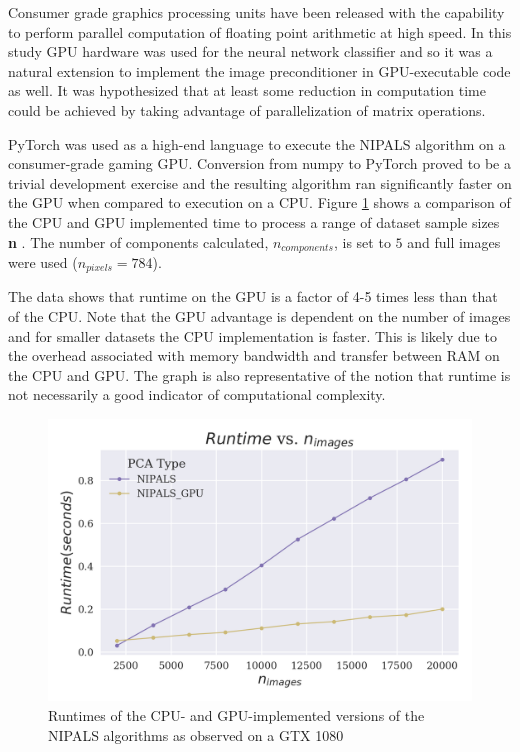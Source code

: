 \documentclass[12pt]{article}
\begin{document}
Consumer grade graphics processing units have been released with the capability to perform parallel computation of floating point arithmetic at high speed. In this study GPU hardware was used for the neural network classifier and so it was a natural extension to implement the image preconditioner in GPU-executable code as well. It was hypothesized that at least some reduction in computation time could be achieved by taking advantage of parallelization of matrix operations.

PyTorch was used as a high-end language to execute the NIPALS algorithm on a consumer-grade gaming GPU. Conversion from numpy to PyTorch proved to be a trivial development exercise and the resulting algorithm ran significantly faster on the GPU when compared to execution on a CPU. Figure \ref{parallelization} shows a comparison of the CPU and GPU implemented time to process a range of dataset sample sizes \textbf{n} . The number of components calculated, $n_{components}$, is set to $5$ and full images were used ($n_{pixels}=784$).

The data shows that runtime on the GPU is a factor of 4-5 times less than that of the CPU. Note that the GPU advantage is dependent on the number of images and for smaller datasets the CPU implementation is faster. This is likely due to the overhead associated with memory bandwidth and transfer between RAM on the CPU and GPU. The graph is also representative of the notion that runtime is not necessarily a good indicator of computational complexity.

\begin{figure}[H]
\begin{center}
\includegraphics[width=\textwidth]{U_GPU.png}
\caption{Runtimes of the CPU- and GPU-implemented versions of the NIPALS algorithms as observed on a GTX 1080}
\label{parallelization}
\end{center}
\end{figure}
\end{document}

